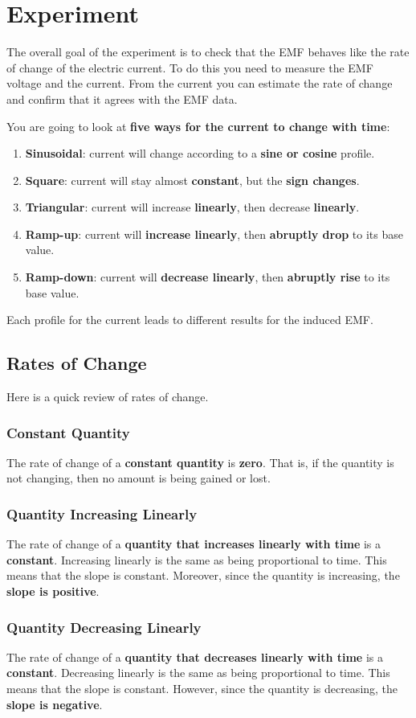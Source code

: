 \section{Experiment}
%
The overall goal of the experiment is to check that the EMF behaves like the rate of change of the electric current. To do this you need to measure the EMF voltage and the current. From the current you can estimate the rate of change and confirm that it agrees with the EMF data.

You are going to look at \textbf{five ways for the current to change with time}:
\begin{enumerate}
	\item \textbf{Sinusoidal}: current will change according to a \textbf{sine or cosine} profile.
	\item \textbf{Square}: current will stay almost \textbf{constant}, but the \textbf{sign changes}.
	\item \textbf{Triangular}: current will increase \textbf{linearly}, then decrease \textbf{linearly}.
	\item \textbf{Ramp-up}: current will \textbf{increase linearly}, then \textbf{abruptly drop} to its base value.
	\item \textbf{Ramp-down}: current will \textbf{decrease linearly}, then \textbf{abruptly rise} to its base value.
\end{enumerate}
Each profile for the current leads to different results for the induced EMF.
%
\subsection{Rates of Change}
%
Here is a quick review of rates of change.
%
\subsubsection{Constant Quantity}
%
The rate of change of a \textbf{constant quantity} is \textbf{zero}. That is, if the quantity is not changing, then no amount is being gained or lost.
%
\subsubsection{Quantity Increasing Linearly}
%
The rate of change of a \textbf{quantity that increases linearly with time} is a \textbf{constant}. Increasing linearly is the same as being proportional to time. This means that the slope is constant. Moreover, since the quantity is increasing, the \textbf{slope is positive}.
%
\subsubsection{Quantity Decreasing Linearly}
%
The rate of change of a \textbf{quantity that decreases linearly with time} is a \textbf{constant}. Decreasing linearly is the same as being proportional to time. This means that the slope is constant. However, since the quantity is decreasing, the \textbf{slope is negative}.
%
